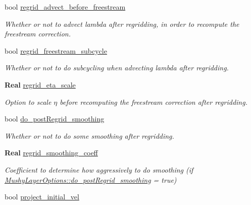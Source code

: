 \begin{DoxyCompactItemize}
bool \hyperlink{struct_mushy_layer_options_a74ed5d4f02c0e0af01281446c30d3d7b}{regrid\+\_\+advect\+\_\+before\+\_\+freestream}
\begin{DoxyCompactList}\small\item\em Whether or not to advect lambda after regridding, in order to recompute the freestream correction. \end{DoxyCompactList}\item 
bool \hyperlink{struct_mushy_layer_options_aebd1a65fc80b78c57d6b945685cfa742}{regrid\+\_\+freestream\+\_\+subcycle}
\begin{DoxyCompactList}\small\item\em Whether or not to do subcycling when advecting lambda after regridding. \end{DoxyCompactList}\item 
\textbf{ Real} \hyperlink{struct_mushy_layer_options_a60ecf9ad0f510e7f77233b524cd86dae}{regrid\+\_\+eta\+\_\+scale}
\begin{DoxyCompactList}\small\item\em Option to scale $ \eta $ before recomputing the freestream correction after regridding. \end{DoxyCompactList}\item 
\mbox{\label{struct_mushy_layer_options_a55a4f6b0e5f9c61efe4a0af51aff8250}} 
bool \hyperlink{struct_mushy_layer_options_a55a4f6b0e5f9c61efe4a0af51aff8250}{do\+\_\+post\+Regrid\+\_\+smoothing}
\begin{DoxyCompactList}\small\item\em Whether or not to do some smoothing after regridding. \end{DoxyCompactList}\item 
\mbox{\label{struct_mushy_layer_options_a5f196fa338270027116ae0c14588655a}} 
\textbf{ Real} \hyperlink{struct_mushy_layer_options_a5f196fa338270027116ae0c14588655a}{regrid\+\_\+smoothing\+\_\+coeff}
\begin{DoxyCompactList}\small\item\em Coefficient to determine how aggressively to do smoothing (if \hyperlink{struct_mushy_layer_options_a55a4f6b0e5f9c61efe4a0af51aff8250}{Mushy\+Layer\+Options\+::do\+\_\+post\+Regrid\+\_\+smoothing} = true) \end{DoxyCompactList}\item 
bool \hyperlink{struct_mushy_layer_options_a0bd978ad44ee7dff6ca8d00c9092a18b}{project\+\_\+initial\+\_\+vel}

\end{DoxyCompactItemize}
